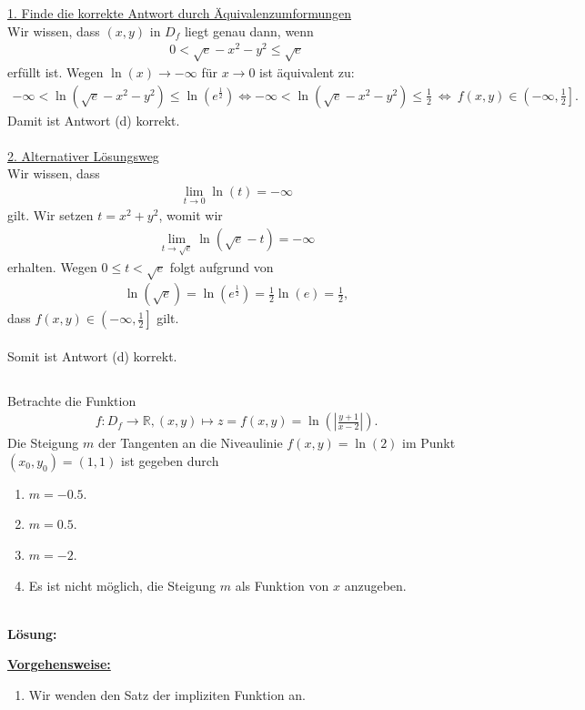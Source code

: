 \underline{1. Finde die korrekte Antwort durch Äquivalenzumformungen}\\
Wir wissen, dass $ (x,y) $ in $ D_f $ liegt genau dann, wenn
\begin{align*}
0 < \sqrt{e} - x^2 -y^2 \leq \sqrt{e} 
\end{align*}
erfüllt ist. Wegen $ \ln (x) \to -\infty $ für $ x \to 0 $ ist äquivalent zu:
\begin{align*}
- \infty < \ln (\sqrt{e} -x^2 -y^2) \leq \ln(e^{\frac{1}{2}})
\Leftrightarrow
- \infty < \ln (\sqrt{e} -x^2 -y^2) \leq \frac{1}{2}
\ \Leftrightarrow \
f(x,y) \in \left( -\infty , \frac{1}{2} \right].
\end{align*}
Damit ist Antwort (d) korrekt.\\
\\
\underline{2. Alternativer Lösungsweg}\\
Wir wissen, dass 
\begin{align*}
\lim \limits_{t\to 0} \ln(t) = - \infty
\end{align*}
gilt. Wir setzen $ t = x^2 + y^2 $, womit wir 
\begin{align*}
\lim \limits_{t \to \sqrt{e}} \ln(\sqrt{e} - t ) = -\infty
\end{align*}
erhalten. Wegen $ 0 \leq t < \sqrt{e}  $ folgt aufgrund von
\begin{align*}
\ln(\sqrt{e}) = \ln(e^{\frac{1}{2}}) = \frac{1}{2} \ln(e) = \frac{1}{2},
\end{align*}
dass $ f(x,y) \in \left( - \infty , \frac{1}{2} \right] $ gilt.\\
\\
Somit ist Antwort (d) korrekt.
\newpage

\subsection*{}
Betrachte die Funktion
\begin{align*}
f :D_f \to \mathbb{R},
(x,y) \mapsto
z = f(x,y) = \ln \left( \left| \frac{y+1}{x-2} \right|\right).
\end{align*}
Die Steigung $ m $ der Tangenten an die Niveaulinie $ f(x,y) = \ln(2) $ im Punkt $ (x_0,y_0) = (1,1) $ ist gegeben durch
\renewcommand{\labelenumi}{(\alph{enumi})}
\begin{enumerate}
	\item 
	$ m = -0.5 $.
	\item
	$ m = 0.5 $.
	\item
	$ m = -2 $.
	\item
	Es ist nicht möglich, die Steigung $ m $ als Funktion von $ x $ anzugeben.
\end{enumerate}
\ \\
\textbf{Lösung:}
\begin{mdframed}
\underline{\textbf{Vorgehensweise:}}
\renewcommand{\labelenumi}{\theenumi.}
\begin{enumerate}
\item Wir wenden den Satz der impliziten Funktion an.
\end{enumerate}
\end{mdframed}

